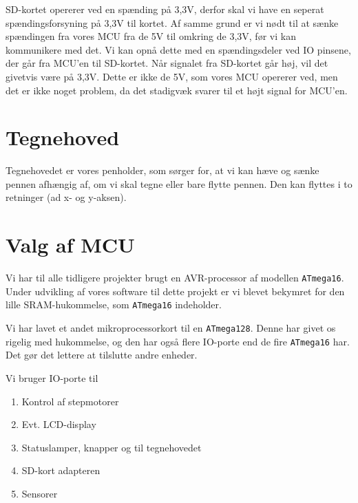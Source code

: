 SD-kortet opererer ved en spænding på 3,3V, derfor skal vi have en
seperat spændingsforsyning på 3,3V til kortet. Af samme grund er vi
nødt til at sænke spændingen fra vores MCU fra de 5V til omkring de
3,3V, før vi kan kommunikere med det. Vi kan opnå dette med en
spændingsdeler ved IO pinsene, der går fra MCU'en til SD-kortet. Når
signalet fra SD-kortet går høj, vil det givetvis være på 3,3V. Dette
er ikke de 5V, som vores MCU opererer ved, men det er ikke noget
problem, da det stadigvæk svarer til et højt signal for MCU'en.


\section{Tegnehoved}
\label{sc:d-tegnehoved}
Tegnehovedet er vores penholder, som sørger for, at vi kan hæve og sænke
pennen afhængig af, om vi skal tegne eller bare flytte pennen. Den kan
flyttes i to retninger (ad x- og y-aksen).

\section{Valg af MCU}
\label{sc:d-mikroprocessor}

Vi har til alle tidligere projekter brugt en AVR-processor af modellen
\texttt{ATmega16}. Under udvikling af vores software til dette projekt
er vi blevet bekymret for den lille SRAM-hukommelse, som
\texttt{ATmega16} indeholder.

Vi har lavet et andet mikroprocessorkort til en
\texttt{ATmega128}. Denne har givet os rigelig med hukommelse, og den
har også flere IO-porte end de fire \texttt{ATmega16} har. Det gør det
lettere at tilslutte andre enheder.

Vi bruger IO-porte til
\begin{enumerate} \firmlist
\item{Kontrol af stepmotorer}
\item{Evt. LCD-display}
\item{Statuslamper, knapper og til tegnehovedet}
\item{SD-kort adapteren}
\item{Sensorer}
\end{enumerate}



